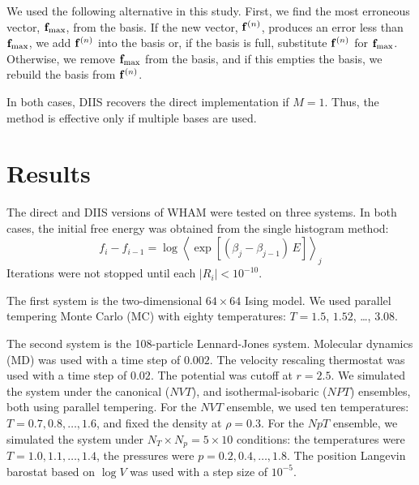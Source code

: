 \documentclass[aip,jcp,preprint,superscriptaddress]{revtex4-1}
\begin{document}
We used the following alternative
in this study.
%
First, we find the most erroneous vector,
$\mathbf{f}_\mathrm{max}$, from the basis.
%
If the new vector, $\mathbf{f}^{(n)}$,
produces an error less than $\mathbf{f}_\mathrm{max}$,
we add $\mathbf{f}^{(n)}$ into the basis
or, if the basis is full,
substitute $\mathbf{f}^{(n)}$ for $\mathbf{f}_\mathrm{max}$.
%
Otherwise,
we remove $\mathbf{f}_\mathrm{max}$ from the basis,
and if this empties the basis,
we rebuild the basis from $\mathbf{f}^{(n)}$.
%



In both cases,
DIIS recovers the direct implementation
if $M = 1$.
%
Thus,
the method is effective
only if multiple bases are used.





\section{Results}





The direct and DIIS versions of WHAM
were tested on three systems.
%
In both cases,
the initial free energy was obtained from
the single histogram method:
%
\begin{equation*}
f_i - f_{i-1}
=
\log
\left\langle
  \exp\left[
    (\beta_j - \beta_{j-1}) \, E
  \right]
\right\rangle_j
\end{equation*}
%
Iterations were not stopped
until each $|R_i| < 10^{-10}$.



The first system is
the two-dimensional $64\times64$ Ising model.
%
We used parallel tempering\cite{
  swendsen1986, *geyer1991, *hukushima1996, *hansmann1997,
  *earl2005}
Monte Carlo (MC)
with
eighty temperatures: $T = 1.5$, $1.52$, \dots, $3.08$.



The second system is the 108-particle Lennard-Jones system.
%
Molecular dynamics (MD)
was used with a time step of $0.002$.
The velocity rescaling thermostat\cite{bussi2007}
was used with a time step of $0.02$.
%
The potential was cutoff at $r = 2.5$.
%
We simulated the system under
the canonical ($NVT$), and isothermal-isobaric ($NPT$) ensembles,
both using parallel tempering.
%
For the $NVT$ ensemble,
we used ten temperatures: $T = 0.7, 0.8, \dots, 1.6$,
and fixed the density at $\rho = 0.3$.
%
For the $NpT$ ensemble,
we simulated the system
under $N_T \times N_p = 5\times 10$ conditions:
the temperatures were $T = 1.0, 1.1, \dots, 1.4$,
the pressures were $p = 0.2, 0.4, \dots, 1.8$.
%
The position Langevin barostat based on $\log V$
was used with a step size of $10^{-5}$.
\end{document}
